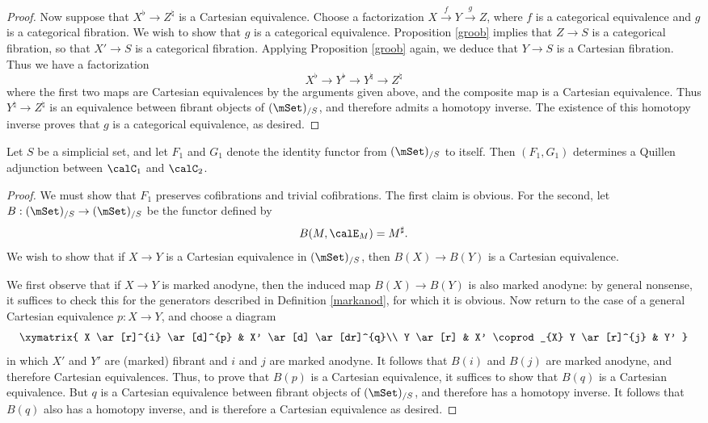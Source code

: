 \begin{proof}
Now suppose that $X^{\flat} \rightarrow Z^{\natural}$ is a Cartesian equivalence. Choose a factorization $X \stackrel{f}{\rightarrow} Y \stackrel{g}{\rightarrow} Z$, where $f$ is a categorical equivalence and $g$ is a categorical fibration. We wish to show that $g$ is a categorical equivalence. 
Proposition \ref{groob} implies that $Z \rightarrow S$ is a categorical fibration, so that $X' \rightarrow S$ is a categorical fibration. Applying Proposition \ref{groob} again, we deduce that
$Y \rightarrow S$ is a Cartesian fibration. Thus we have a factorization
$$ X^{\flat} \rightarrow Y^{\flat} \rightarrow Y^{\natural} \rightarrow Z^{\natural}$$
where the first two maps are Cartesian equivalences by the arguments given above, and the 
composite map is a Cartesian equivalence. Thus $Y^{\natural} \rightarrow Z^{\natural}$ is an equivalence between fibrant objects of $(\mSet)_{/S}$, and therefore admits a homotopy inverse. The existence of this homotopy inverse proves that $g$ is a categorical equivalence, as desired.
\end{proof}

\begin{proposition}\label{marklocal}
Let $S$ be a simplicial set, and let $F_1$ and $G_1$ denote the identity functor from
$(\mSet)_{/S}$ to itself. Then $(F_1,G_1)$ determines a Quillen adjunction between
$\calC_1$ and $\calC_2$.
\end{proposition}

\begin{proof}
We must show that $F_1$ preserves cofibrations and trivial cofibrations. The first claim is obvious. For the second,
let $B: (\mSet)_{/S} \rightarrow (\mSet)_{/S}$ be the functor defined by
$$B(M, \calE_M) = M^{\sharp}.$$
We wish to show that if $X \rightarrow Y$ is a Cartesian equivalence in $(\mSet)_{/S}$, then
$B(X) \rightarrow B(Y)$ is a Cartesian equivalence.

We first observe that if $X \rightarrow Y$ is marked anodyne, then the induced map $B(X) \rightarrow B(Y)$ is also marked anodyne: by general nonsense, it suffices to check this for the generators described in Definition \ref{markanod}, for which it is obvious. Now return to the case of a general Cartesian equivalence $p: X \rightarrow Y$, and choose a diagram
$$ \xymatrix{ X \ar[r]^{i} \ar[d]^{p} & X' \ar[d] \ar[dr]^{q}\\
Y \ar[r] & X' \coprod_{X} Y \ar[r]^{j} & Y' }$$
in which $X'$ and $Y'$ are (marked) fibrant and $i$ and $j$ are marked anodyne. It follows that
$B(i)$ and $B(j)$ are marked anodyne, and therefore Cartesian equivalences. Thus, to prove that
$B(p)$ is a Cartesian equivalence, it suffices to show that $B(q)$ is a Cartesian equivalence.
But $q$ is a Cartesian equivalence between fibrant objects of $(\mSet)_{/S}$, and therefore has a homotopy inverse. It follows that $B(q)$ also has a homotopy inverse, and is therefore a Cartesian equivalence as desired.
\end{proof}


